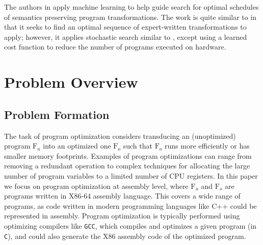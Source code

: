 \documentclass{article}
\newcommand\p{\ensuremath{{\mathrm{F}_u}}}
\newcommand\popt{\ensuremath{{\mathrm{F}_o}}}
\begin{document}
The authors in \cite{chen2018learning} apply machine learning to help guide search for optimal schedules of semantics preserving program transformations. The work is quite similar to \cite{chen2019learning} in that it seeks to find an optimal sequence of expert-written transformations to apply; however, it applies stochastic search similar to \cite{schkufza2013stochastic}, except using a learned cost function to reduce the number of programs executed on hardware. 

\section{Problem Overview}


\subsection{Problem Formation}

The task of program optimization considers transducing an (unoptimized) program $\p$ into an optimized one $\popt$ such that $\popt$ runs more efficiently or has smaller memory footprints.
Examples of program optimizations can range from removing a redundant operation to complex techniques for allocating the large number of program variables to a limited number of CPU registers.
In this paper we focus on program optimization at assembly level, where $\p$ and $\popt$ are programs written in X86-64 assembly language.
This covers a wide range of programs, as code written in modern programming languages like C++ could be represented in assembly.
Program optimization is typically performed using optimizing compilers like \texttt{GCC}, which compiles and optimizes a given program (in \texttt{C}), and could also generate the X86 assembly code of the optimized program.
\end{document}
